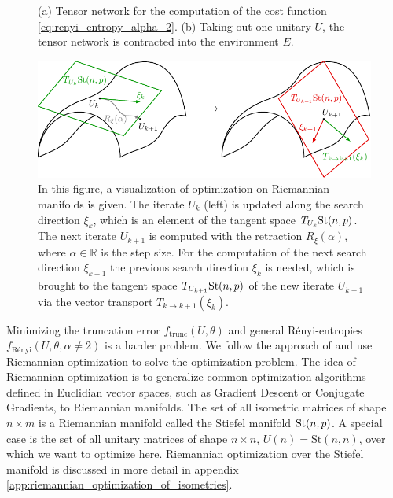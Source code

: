 \begin{figure}
{	}
	\caption{(a) Tensor network for the computation of the cost function \eqref{eq:renyi_entropy_alpha_2}. (b) Taking out one unitary $U$, the tensor network is contracted into the environment $E$.}
	\label{fig:disentangling_evenbly_vidal_algorithm}
\end{figure}
\begin{figure}
	\centering
	\includegraphics[scale=1]{figures/tikz/disoTPS/riemannian_optimization/riemannian_optimization.pdf}
	\caption{In this figure, a visualization of optimization on Riemannian manifolds is given. The iterate $U_k$ (left) is updated along the search direction $\xi_k$, which is an element of the tangent space $T_{U_k}\text{St}(n,p)$. The next iterate $U_{k+1}$ is computed with the retraction $R_\xi\left(\alpha\right)$, where $\alpha\in\mathbb{R}$ is the step size. For the computation of the next search direction $\xi_{k+1}$ the previous search direction $\xi_k$ is needed, which is brought to the tangent space $T_{U_{k+1}}\text{St}(n,p)$ of the new iterate $U_{k+1}$ via the vector transport $T_{k\rightarrow k+1}\left(\xi_k\right)$.}
	\label{fig:disentangling_riemannian_optimization}
\end{figure}
Minimizing the truncation error $f_\text{trunc}\left(U,\theta\right)$ and general Rényi-entropies $f_\text{Rényi}\left(U,\theta,\alpha\neq2\right)$ is a harder problem. We follow the approach of \cite{cite:isometric_tensor_network_states_in_two_dimensions, cite:efficient_simulation_of_dynamics_in_two_dimensional_quantum_spin_systems} and use Riemannian optimization \cite{cite:optimization_on_matrix_manifolds, cite:riemannian_optimization_isometric_tensor_networks, cite:riemannian_geometry_automatic_differentiation_quantum_physics, cite:pymanopt} to solve the optimization problem. The idea of Riemannian optimization is to generalize common optimization algorithms defined in Euclidian vector spaces, such as Gradient Descent or Conjugate Gradients, to Riemannian manifolds. The set of all isometric matrices of shape $n\times m$ is a Riemannian manifold called the Stiefel manifold $\text{St}(n,p)$. A special case is the set of all unitary matrices of shape $n\times n$, $U(n)=\text{St}(n, n)$, over which we want to optimize here. Riemannian optimization over the Stiefel manifold is discussed in more detail in appendix \ref{app:riemannian_optimization_of_isometries}. \par
